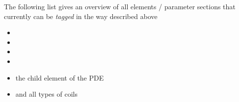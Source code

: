 \begin{itemize}
      The following list gives an overview of all elements / parameter
      sections that currently can be \emph{tagged} in the way described above
      \begin{itemize}
      \item {}
      \item {}
      \item {}
      \item {}
      \item the  child element of the  PDE
      \item and all types of coils
      \end{itemize}
 
\end{itemize}
%

